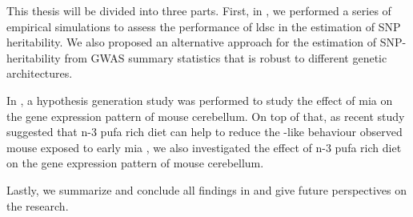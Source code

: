	This thesis will be divided into three parts.
	First, in , we performed a series of empirical simulations to assess the performance of \gls{ldsc} in the estimation of \gls{SNP} heritability. 
	We also proposed an alternative approach for the estimation of \gls{SNP}-heritability from \gls{GWAS} summary statistics that is robust to different genetic architectures.
	
	In , a hypothesis generation study was performed to study the effect of \gls{mia} on the gene expression pattern of mouse cerebellum. 
	On top of that, as recent study suggested that n-3 \gls{pufa} rich diet can help to reduce the -like behaviour observed mouse exposed to early \gls{mia} \citep{Li2015}, we also investigated the effect of n-3 \gls{pufa} rich diet on the gene expression pattern of mouse cerebellum.
	
	Lastly, we summarize and conclude all findings in  and give future perspectives on the  research.
	
